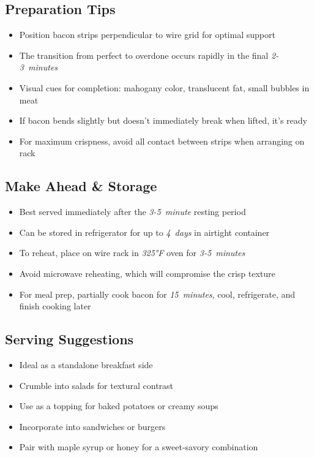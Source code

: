 \documentclass[11pt,letterpaper]{article}
\begin{document}
{\begin{multicols}{2}
\subsection*{Preparation Tips}
\begin{itemize}
    \item Position bacon strips perpendicular to wire grid for optimal support
    \item The transition from perfect to overdone occurs rapidly in the final \textit{2-3~minutes}
    \item Visual cues for completion: mahogany color, translucent fat, small bubbles in meat
    \item If bacon bends slightly but doesn't immediately break when lifted, it's ready
    \item For maximum crispness, avoid all contact between strips when arranging on rack
\end{itemize}

\subsection*{Make Ahead \& Storage}
\begin{itemize}
    \item Best served immediately after the \textit{3-5~minute} resting period
    \item Can be stored in refrigerator for up to \textit{4~days} in airtight container
    \item To reheat, place on wire rack in \textit{325°F} oven for \textit{3-5~minutes}
    \item Avoid microwave reheating, which will compromise the crisp texture
    \item For meal prep, partially cook bacon for \textit{15~minutes}, cool, refrigerate, and finish cooking later
\end{itemize}

\subsection*{Serving Suggestions}
\begin{itemize}
    \item Ideal as a standalone breakfast side
    \item Crumble into salads for textural contrast
    \item Use as a topping for baked potatoes or creamy soups
    \item Incorporate into sandwiches or burgers
    \item Pair with maple syrup or honey for a sweet-savory combination
\end{itemize}

\end{multicols}
}
\end{document}
